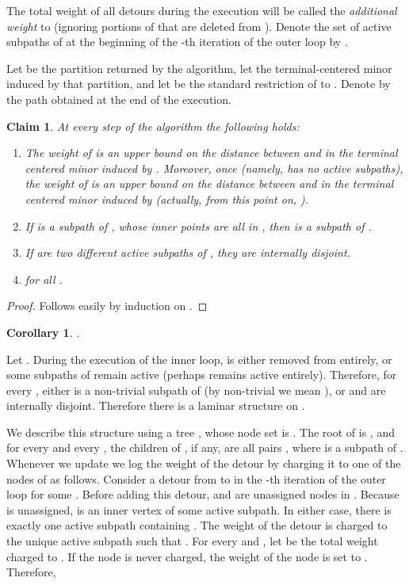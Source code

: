 \documentclass[twoside,leqno,twocolumn]{article}
\newtheorem{claim}[lemma]{Claim}
\newtheorem{corollary}[theorem]{Corollary}
\newtheorem{claim}[theorem]{Claim}
\begin{document}
The total weight of all detours during the execution will be called the {\em additional weight} to  (ignoring portions of  that are deleted from ).
Denote the set of active subpaths of  at the beginning of the -th iteration of the outer loop by .

Let  be the partition returned by the algorithm, let  the terminal-centered minor induced by that partition, and let  be the standard restriction of  to . 
Denote by  the path obtained at the end of the execution.
\begin{claim} 
At every step of the algorithm the following holds:
\begin{enumerate}
	\item The weight of  is an upper bound on the distance between  and  in the terminal centered minor induced by . Moreover, once  (namely,  has no active subpaths), the weight of  is an upper bound on the distance between  and  in the terminal centered minor induced by  (actually, from this point on, ).
	\item If  is a subpath of , whose inner points are all in , then  is a subpath of .
	\item If  are two different active subpaths of , they are internally disjoint.
	\item  for all .
\end{enumerate}
\end{claim}

\begin{proof}
Follows easily by induction on .
\end{proof} 
\begin{corollary} \label{cor:costMinor}
.
\end{corollary}

Let . During the execution of the inner loop,  is either removed from  entirely, or some subpaths of  remain active (perhaps  remains active entirely). Therefore, for every , either  is a non-trivial subpath of  (by non-trivial we mean ), or  and  are internally disjoint. Therefore there is a laminar structure on . 

We describe this structure using a tree , whose node set is . The root of  is , and for every  and every , the children of , if any, are all pairs , where  is a subpath of .
Whenever we update  we log the weight of the detour by charging it to one of the nodes of  as follows. Consider a detour from  to  in the -th iteration of the outer loop for some . Before adding this detour,  and  are unassigned nodes in . Because  is unassigned,  is an inner vertex of some active subpath. In either case, there is exactly one active subpath containing . The weight of the detour is charged to the unique active subpath  such that . For every  and , let  be the total weight charged to . If the node is never charged, the weight of the node is set to . Therefore, 
\end{document}
